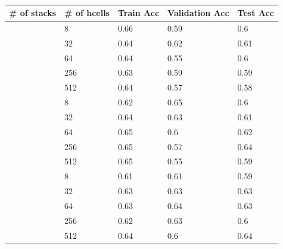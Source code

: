 \documentclass[12pt, a4paper]{book}
\begin{document}
\clearpage

\begin{latin}
    \begin{table}[h]
    \centering
    \caption{}
    \label{gru_stacked_layer}
    \begin{tabular}{c|l|l|l|l}
        \rowcolor{teal!50}
        \# of stacks & \# of hcells & Train Acc & Validation Acc & Test Acc \\
        \hline
        \rowcolor{teal!10}
         & 8 & 0.66 & 0.59 & 0.6 \\ \rowcolor{teal!10}
        & 32 & 0.64 & 0.62 & 0.61 \\ \rowcolor{teal!10}
        & 64 & 0.64 & 0.55 & 0.6 \\ \rowcolor{teal!10}
        & 256 & 0.63 & 0.59 & 0.59\\ \rowcolor{teal!10}
        \multirow{-5}{*}{2} & 512 & 0.64 & 0.57 & 0.58 \\ \rowcolor{teal!40} \hline
        & 8 & 0.62 & 0.65 & 0.6\\ \rowcolor{teal!40}
        & 32 & 0.64 & 0.63 & 0.61 \\ \rowcolor{teal!40}
        & 64 & 0.65 & 0.6 & 0.62 \\ \rowcolor{teal!40}
        & 256 & 0.65 & 0.57 & 0.64 \\ \rowcolor{teal!40}
        \multirow{-5}{*}{3} & 512 & 0.65 & 0.55 & 0.59 \\ \rowcolor{teal!10} \hline
        & 8 & 0.61 & 0.61 & 0.59 \\ \rowcolor{teal!10}
        & 32 & 0.63 & 0.63 & 0.63 \\ \rowcolor{teal!10}
        & 64 & 0.63 & 0.64 & 0.63 \\ \rowcolor{teal!10}
        & 256 & 0.62 & 0.63 & 0.6 \\ \rowcolor{teal!10}
        \multirow{-5}{*}{4}& 512 & 0.64 & 0.6 & 0.64 \\
    \end{tabular}
    \end{table}
\end{latin}
\end{document}
